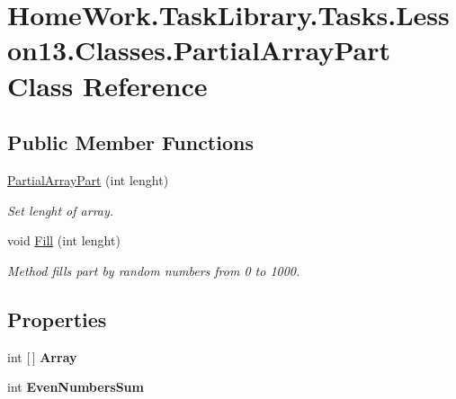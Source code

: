 \hypertarget{class_home_work_1_1_task_library_1_1_tasks_1_1_lesson13_1_1_classes_1_1_partial_array_part}{}\section{Home\+Work.\+Task\+Library.\+Tasks.\+Lesson13.\+Classes.\+Partial\+Array\+Part Class Reference}
\label{class_home_work_1_1_task_library_1_1_tasks_1_1_lesson13_1_1_classes_1_1_partial_array_part}
\subsection*{Public Member Functions}
\begin{DoxyCompactItemize}
\item 
\mbox{\hyperlink{class_home_work_1_1_task_library_1_1_tasks_1_1_lesson13_1_1_classes_1_1_partial_array_part_aeb60b50917fc3949d04e769b5f80dd6f}{Partial\+Array\+Part}} (int lenght)
\begin{DoxyCompactList}\small\item\em Set lenght of array. \end{DoxyCompactList}\item 
void \mbox{\hyperlink{class_home_work_1_1_task_library_1_1_tasks_1_1_lesson13_1_1_classes_1_1_partial_array_part_a1d747a787b12adadd8905efe64d07a1c}{Fill}} (int lenght)
\begin{DoxyCompactList}\small\item\em Method fills part by random numbers from 0 to 1000. \end{DoxyCompactList}\end{DoxyCompactItemize}
\subsection*{Properties}
\begin{DoxyCompactItemize}
\item 
\mbox{\label{class_home_work_1_1_task_library_1_1_tasks_1_1_lesson13_1_1_classes_1_1_partial_array_part_adff60e13b3a355543896984e9d835211}} 
int \mbox{[}$\,$\mbox{]} {\bfseries Array}
\item 
\mbox{\label{class_home_work_1_1_task_library_1_1_tasks_1_1_lesson13_1_1_classes_1_1_partial_array_part_a107ad4b5d4cbf85b86a50501ab0c8868}} 
int {\bfseries Even\+Numbers\+Sum}
\end{DoxyCompactItemize}


